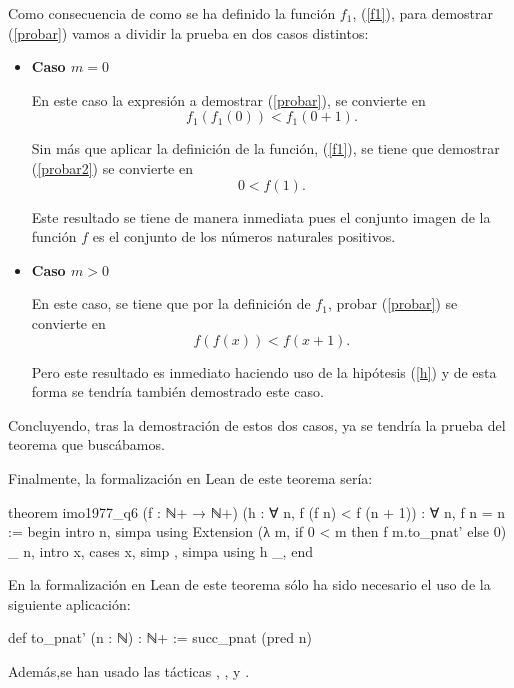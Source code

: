 \begin{demostracion}
  Como consecuencia de como se ha definido la función \(f_1\),
  (\ref{f1}), para demostrar (\ref{probar}) vamos a dividir la prueba en
  dos casos distintos:
  \begin{itemize}
  \item \textbf{Caso \(m=0\)}

    En este caso la expresión a demostrar (\ref{probar}), se convierte
    en
    \begin{equation}\label{probar2}
      f_1(f_1(0)) < f_1(0+1).
    \end{equation}

    Sin más que aplicar la definición de la función, (\ref{f1}), se
    tiene que demostrar (\ref{probar2}) se convierte en
    \begin{equation}
      0 < f(1).
    \end{equation}

    Este resultado se tiene de manera inmediata pues el conjunto imagen
    de la función \(f\) es el conjunto de los números naturales
    positivos.

  \item \textbf{Caso \(m>0\)}

    En este caso, se tiene que por la definición de \(f_1\), probar
    (\ref{probar}) se convierte en
    \begin{equation}\label{probar3}
    f(f(x)) < f(x+1).
    \end{equation}

    Pero este resultado es inmediato haciendo uso de la hipótesis
    (\ref{h}) y de esta forma se tendría también demostrado este caso.
  \end{itemize}

  Concluyendo, tras la demostración de estos dos casos, ya se tendría
  la prueba del teorema que buscábamos.
\end{demostracion}

Finalmente, la formalización en Lean de este teorema sería:
\begin{leancode}
theorem imo1977_q6
  (f : ℕ+ → ℕ+)
  (h : ∀ n, f (f n) < f (n + 1))
  : ∀ n, f n = n :=
begin
  intro n,
  simpa using Extension (λ m, if 0 < m then f m.to_pnat' else 0) _ n,
  intro x,
  cases x,
  { simp },
  { simpa using h _},
end
\end{leancode}

En la formalización en Lean de este teorema sólo ha sido necesario el
uso de la siguiente aplicación:
\begin{leancode}
def to_pnat' (n : ℕ) : ℕ+ := succ_pnat (pred n)
\end{leancode}
Además,se han usado las tácticas
,
,
 y
.

